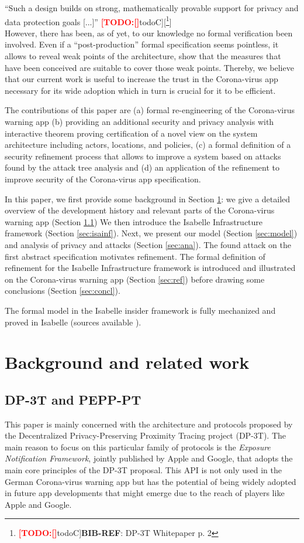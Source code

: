 \documentclass{llncs}
\newcommand{\TODO}[1]{\textcolor{red}{\textbf{[TODO:#1]}}}
\newcommand*{\TODOfn}[2][noteC]{\TODO[#1]{[\footnote{\TODO[#1]{#2}}]}}
\newcommand*{\TODOref}[2][todoC]{\TODOfn[#1]{\textbf{BIB-REF}: #2}}
\begin{document}
``Such a design builds on strong, mathematically provable support for privacy and data protection goals [...]'' \TODOref{DP-3T Whitepaper p. 2} \smallskip\\
However, there has been, as of yet, to our knowledge no formal verification been involved.
Even if a ``post-production'' formal specification seems pointless, 
it allows to reveal weak points of the architecture, show that the measures that have
been conceived are suitable to cover those weak points. Thereby, we believe
that our current work is useful to increase the trust in the Corona-virus app necessary for
its wide adoption which in turn is crucial for it to be efficient.

The contributions of this paper are (a) formal re-engineering of the Corona-virus warning app
(b) providing an additional security and privacy analysis with interactive theorem proving
certification of a novel view on the system architecture including actors, locations, and policies,
(c) a formal definition of a security refinement process that allows to improve a system
based on attacks found by the attack tree analysis and (d) an application of the refinement to
improve security of the Corona-virus app specification.

In this paper, we first provide some background in Section \ref{sec:background}:
we give a detailed overview of the development history %
and relevant parts of the Corona-virus warning app (Section \ref{sec:history})
We then introduce the Isabelle Infrastructure framework (Section \ref{sec:isainf}).
Next, we present our model (Section \ref{sec:model}) and analysis of privacy and
attacks (Section \ref{sec:ana}). The found attack on the first abstract specification
motivates refinement. The formal definition of refinement for the Isabelle Infrastructure
framework is introduced and illustrated on the Corona-virus warning app (Section \ref{sec:ref})
before drawing some conclusions (Section \ref{sec:concl}).

The formal model in the Isabelle insider framework is fully mechanized and proved in
Isabelle (sources available \cite{kam:18smc}). 

\section{Background and related work}
\label{sec:background}
\subsection{DP-3T and PEPP-PT}
\label{sec:history}
This paper is mainly concerned with the architecture and protocols proposed by the
Decentralized Privacy-Preserving Proximity Tracing project (DP-3T).
The main reason to focus on this particular family of protocols is the
\textit{Exposure Notification Framework}, jointly published by Apple and Google, that adopts
the main core principles of the DP-3T proposal. This API is not only used in the German
Corona-virus warning app but has the potential of being widely adopted in future
app developments that might emerge due to the reach of players like Apple and Google.
\end{document}
